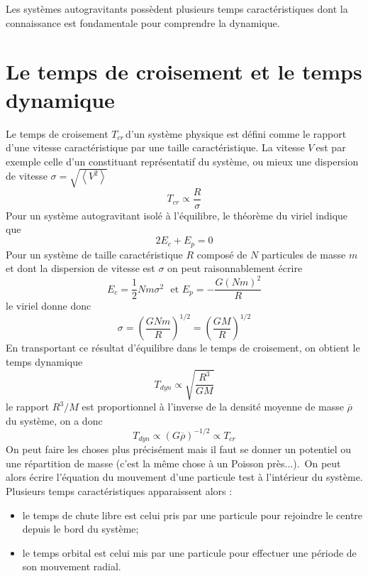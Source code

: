 
Les syst\`{e}mes autogravitants poss\`{e}dent plusieurs temps
caract\'{e}ristiques dont la connaissance est fondamentale pour comprendre la dynamique.

\section{Le temps de croisement et le temps dynamique}

Le
temps de croisement $T_{cr\ }$d'un syst\`{e}me physique est d\'{e}fini comme
le rapport d'une vitesse caract\'{e}ristique par une taille
caract\'{e}ristique. La vitesse $V\ $est par exemple celle d'un constituant
repr\'{e}sentatif du syst\`{e}me, ou mieux une dispersion de vitesse
$\sigma=\sqrt{\left\langle V^{2}\right\rangle }$%
\[
T_{cr}\propto\frac{R}{\sigma}%
\]
Pour un syst\`{e}me autogravitant isol\'{e} \`{a} l'\'{e}quilibre, le
th\'{e}or\`{e}me du viriel indique que
\[
2E_{c}+E_{p}=0
\]
Pour un syst\`{e}me de taille caract\'{e}ristique $R$ compos\'{e} de $N$
particules de masse $m$ et dont la dispersion de vitesse est $\sigma$ on peut
raisonnablement \'{e}crire%
\[
E_{c}=\frac{1}{2}Nm\sigma^{2}\ \ \ \text{et\ \ \ }E_{p}=-\frac{G\left(
Nm\right)  ^{2}}{R}%
\]
le viriel donne donc%
\[
\sigma=\left(  \frac{GNm}{R}\right)  ^{1/2}=\left(  \frac{GM}{R}\right)
^{1/2}%
\]
En transportant ce r\'{e}sultat d'\'{e}quilibre dans le temps de croisement,
on obtient le temps dynamique%
\[
T_{dyn}\propto\sqrt{\frac{R^{3}}{GM}}%
\]
le rapport $R^{3}/M$ est proportionnel \`{a} l'inverse de la densit\'{e}
moyenne de masse $\overline{\rho}\ $du syst\`{e}me, on a donc%
\[
T_{dyn}\propto\left(  G\overline{\rho}\right)  ^{-1/2}\propto T_{cr}%
\label{def:T-dyn_tcr}%
\]
On peut faire les choses plus pr\'{e}cis\'{e}ment mais il faut se donner un
potentiel ou une r\'{e}partition de masse (c'est la m\^{e}me chose \`{a} un
Poisson pr\`{e}s...).\ On peut alors \'{e}crire l'\'{e}quation du mouvement
d'une particule test \`{a} l'int\'{e}rieur du syst\`{e}me. Plusieurs temps
caract\'{e}ristiques apparaissent alors :

\begin{itemize}
\item le temps de chute libre est celui pris par une particule pour rejoindre
le centre depuis le bord du syst\`{e}me;

\item le temps orbital est celui mis par une particule pour effectuer une
p\'{e}riode de son mouvement radial.
\end{itemize}

